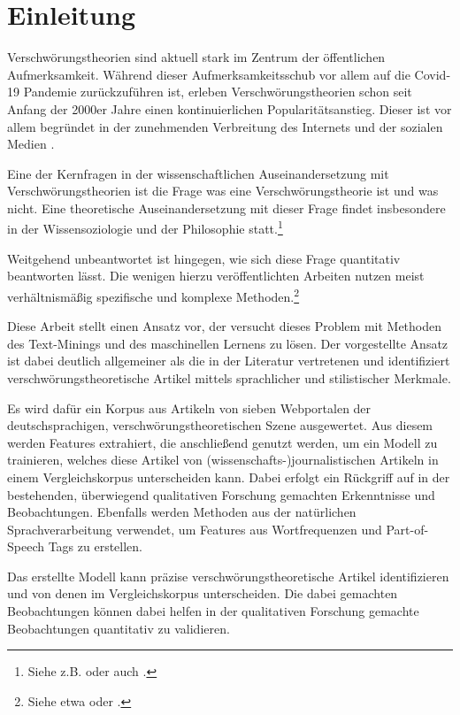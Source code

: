\section{Einleitung}

Verschwörungstheorien sind aktuell stark im Zentrum der öffentlichen Aufmerksamkeit.
Während dieser Aufmerksamkeitsschub vor allem auf die Covid-19 Pandemie zurückzuführen ist, erleben Verschwörungstheorien schon seit Anfang der 2000er Jahre einen kontinuierlichen Popularitätsanstieg.
Dieser ist vor allem begründet in der zunehmenden Verbreitung des Internets und der sozialen Medien \parencite[vgl.][492]{stano_2020}.

Eine der Kernfragen in der wissenschaftlichen Auseinandersetzung mit Verschwörungstheorien ist die Frage was eine Verschwörungstheorie ist und was nicht.
Eine theoretische Auseinandersetzung mit dieser Frage findet insbesondere in der Wissensoziologie und der Philosophie statt.\footnote{Siehe z.B. \textcite[]{coady_2006} oder auch \textcite[23-53]{uscinski_2014}.}

Weitgehend unbeantwortet ist hingegen, wie sich diese Frage quantitativ beantworten lässt.
Die wenigen hierzu veröffentlichten Arbeiten nutzen meist verhältnismäßig spezifische und komplexe Methoden.\footnote{Siehe etwa \textcite[]{samory_2018} oder \textcite[]{shahsavari_2020}.}

Diese Arbeit stellt einen Ansatz vor, der versucht dieses Problem mit Methoden des Text-Minings und des maschinellen Lernens zu lösen.
Der vorgestellte Ansatz ist dabei deutlich allgemeiner als die in der Literatur vertretenen und identifiziert verschwörungstheoretische Artikel mittels sprachlicher und stilistischer Merkmale.

Es wird dafür ein Korpus aus Artikeln von sieben Webportalen der deutschsprachigen, verschwörungstheoretischen Szene ausgewertet. 
Aus diesem werden Features extrahiert, die anschließend genutzt werden, um ein Modell zu trainieren, welches diese Artikel von (wissenschafts-)journalistischen Artikeln in einem Vergleichskorpus unterscheiden kann.
Dabei erfolgt ein Rückgriff auf in der bestehenden, überwiegend qualitativen Forschung gemachten Erkenntnisse und Beobachtungen.
Ebenfalls werden Methoden aus der natürlichen Sprachverarbeitung verwendet, um Features aus Wortfrequenzen und Part-of-Speech Tags zu erstellen.

Das erstellte Modell kann präzise verschwörungstheoretische Artikel identifizieren und von denen im Vergleichskorpus unterscheiden.
Die dabei gemachten Beobachtungen können dabei helfen in der qualitativen Forschung gemachte Beobachtungen quantitativ zu validieren.